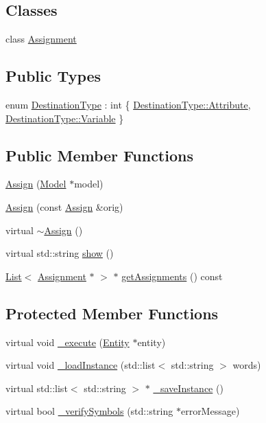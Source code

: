 \subsection*{Classes}
\begin{DoxyCompactItemize}
\item 
class \hyperlink{class_assign_1_1_assignment}{Assignment}
\end{DoxyCompactItemize}
\subsection*{Public Types}
\begin{DoxyCompactItemize}
\item 
enum \hyperlink{class_assign_a6145dc21d25f0d4b222e2474cbeeed98}{Destination\+Type} \+: int \{ \hyperlink{class_assign_a6145dc21d25f0d4b222e2474cbeeed98af2bbdf9f72c085adc4d0404e370f0f4c}{Destination\+Type\+::\+Attribute}, 
\hyperlink{class_assign_a6145dc21d25f0d4b222e2474cbeeed98a47c14840d8e15331fa420b9b2f757cd9}{Destination\+Type\+::\+Variable}
 \}
\end{DoxyCompactItemize}
\subsection*{Public Member Functions}
\begin{DoxyCompactItemize}
\item 
\hyperlink{class_assign_afaa746a0ce157d4606823ad508dc6281}{Assign} (\hyperlink{class_model}{Model} $\ast$model)
\item 
\hyperlink{class_assign_ae4945adcf1b5dcdd3f57faa9dd85a2b0}{Assign} (const \hyperlink{class_assign}{Assign} \&orig)
\item 
virtual \hyperlink{class_assign_aa005626af06022d9101c5e38e794dc47}{$\sim$\+Assign} ()
\item 
virtual std\+::string \hyperlink{class_assign_af5022b92204adcd9ee3e444b7e316d07}{show} ()
\item 
\hyperlink{class_list}{List}$<$ \hyperlink{class_assign_1_1_assignment}{Assignment} $\ast$ $>$ $\ast$ \hyperlink{class_assign_aca4aaa2185cc8770e56e1b6928c33dc0}{get\+Assignments} () const 
\end{DoxyCompactItemize}
\subsection*{Protected Member Functions}
\begin{DoxyCompactItemize}
\item 
virtual void \hyperlink{class_assign_a5fabf69268b2e65d8b01ce247be87a40}{\+\_\+execute} (\hyperlink{class_entity}{Entity} $\ast$entity)
\item 
virtual void \hyperlink{class_assign_a95e3169a6ae13ef3dc6dd9f0dde16c30}{\+\_\+load\+Instance} (std\+::list$<$ std\+::string $>$ words)
\item 
virtual std\+::list$<$ std\+::string $>$ $\ast$ \hyperlink{class_assign_a8b38a0a1bec283f5d2f44f67be5a4a6b}{\+\_\+save\+Instance} ()
\item 
virtual bool \hyperlink{class_assign_a5f3a7d8a7214574fea926cae1b1acb94}{\+\_\+verify\+Symbols} (std\+::string $\ast$error\+Message)
\end{DoxyCompactItemize}
